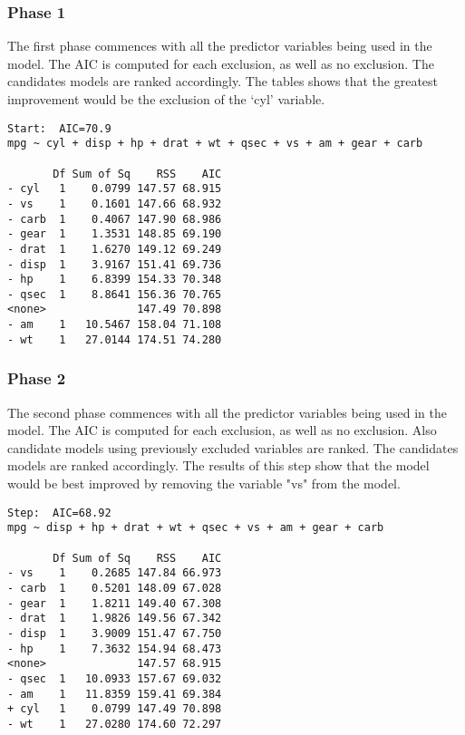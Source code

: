 \subsubsection{Phase 1}
The first phase commences with all the predictor variables being used in the model. The AIC is computed for each exclusion, as well as no exclusion. The candidates models are ranked accordingly. The tables shows that the greatest improvement would be the exclusion of the `cyl' variable.
\footnotesize
\begin{verbatim}
Start:  AIC=70.9
mpg ~ cyl + disp + hp + drat + wt + qsec + vs + am + gear + carb

       Df Sum of Sq    RSS    AIC
- cyl   1    0.0799 147.57 68.915
- vs    1    0.1601 147.66 68.932
- carb  1    0.4067 147.90 68.986
- gear  1    1.3531 148.85 69.190
- drat  1    1.6270 149.12 69.249
- disp  1    3.9167 151.41 69.736
- hp    1    6.8399 154.33 70.348
- qsec  1    8.8641 156.36 70.765
<none>              147.49 70.898
- am    1   10.5467 158.04 71.108
- wt    1   27.0144 174.51 74.280
\end{verbatim}
\normalsize
\subsubsection{Phase 2}
The second phase commences with all the predictor variables being used in the model. The AIC is computed for each exclusion, as well as no exclusion. Also candidate models using previously excluded variables are ranked. The candidates models are ranked accordingly.
The results of this step show that the model would be best improved by removing the variable "vs" from the model.
\footnotesize
\begin{verbatim}
Step:  AIC=68.92
mpg ~ disp + hp + drat + wt + qsec + vs + am + gear + carb

       Df Sum of Sq    RSS    AIC
- vs    1    0.2685 147.84 66.973
- carb  1    0.5201 148.09 67.028
- gear  1    1.8211 149.40 67.308
- drat  1    1.9826 149.56 67.342
- disp  1    3.9009 151.47 67.750
- hp    1    7.3632 154.94 68.473
<none>              147.57 68.915
- qsec  1   10.0933 157.67 69.032
- am    1   11.8359 159.41 69.384
+ cyl   1    0.0799 147.49 70.898
- wt    1   27.0280 174.60 72.297
\end{verbatim}
\normalsize
\newpage
